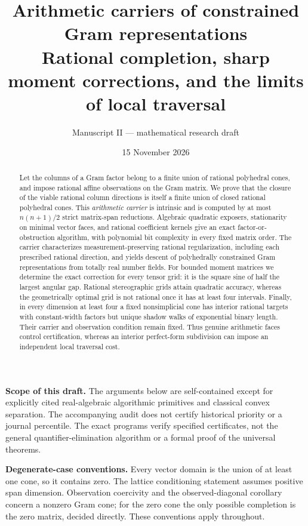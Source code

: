 \documentclass[11pt]{article}
\title{Arithmetic carriers of constrained Gram representations\\[0.4em]
\large Rational completion, sharp moment corrections, and the limits of local traversal}
\author{Manuscript II --- mathematical research draft}
\date{15 November 2026}
\theoremstyle{definition}
\numberwithin{equation}{section}
\begin{document}
\maketitle
\begin{abstract}
Let the columns of a Gram factor belong to a finite union of rational polyhedral cones, and impose rational affine observations on the Gram matrix. We prove that the closure of the viable rational column directions is itself a finite union of closed rational polyhedral cones. This \emph{arithmetic carrier} is intrinsic and is computed by at most $n(n+1)/2$ strict matrix-span reductions. Algebraic quadratic exposers, stationarity on minimal vector faces, and rational coefficient kernels give an exact factor-or-obstruction algorithm, with polynomial bit complexity in every fixed matrix order. The carrier characterizes measurement-preserving rational regularization, including each prescribed rational direction, and yields descent of polyhedrally constrained Gram representations from totally real number fields. For bounded moment matrices we determine the exact correction for every tensor grid: it is the square sine of half the largest angular gap. Rational stereographic grids attain quadratic accuracy, whereas the geometrically optimal grid is not rational once it has at least four intervals. Finally, in every dimension at least four a fixed nonsimplicial cone has interior rational targets with constant-width factors but unique shadow walks of exponential binary length. Their carrier and observation condition remain fixed. Thus genuine arithmetic faces control certification, whereas an interior perfect-form subdivision can impose an independent local traversal cost.
\end{abstract}
\noindent\textbf{Scope of this draft.} The arguments below are self-contained except for explicitly cited real-algebraic algorithmic primitives and classical convex separation. The accompanying audit does not certify historical priority or a journal percentile. The exact programs verify specified certificates, not the general quantifier-elimination algorithm or a formal proof of the universal theorems.
\par\smallskip
\noindent\textbf{Degenerate-case conventions.} Every vector domain is the union of at least one cone, so it contains zero. The lattice conditioning statement assumes positive span dimension. Observation coercivity and the observed-diagonal corollary concern a nonzero Gram cone; for the zero cone the only possible completion is the zero matrix, decided directly. These conventions apply throughout.
\tableofcontents







\end{document}
